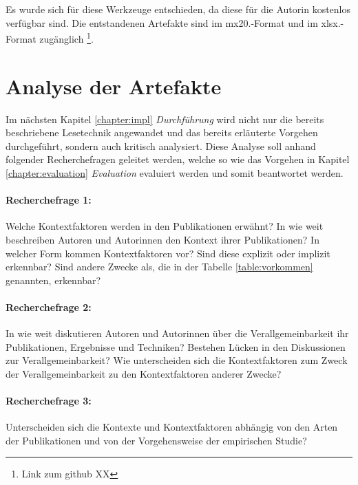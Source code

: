 Es wurde sich für diese Werkzeuge entschieden, da diese für die Autorin kostenlos verfügbar sind.
Die entstandenen Artefakte sind im mx20.-Format und im xlsx.-Format zugänglich \footnote{Link zum github XX}.





\section{Analyse der Artefakte}
\label{sec:analysis-step}
Im nächsten Kapitel \ref{chapter:impl} \textit{Durchführung} wird nicht nur die bereits beschriebene Lesetechnik angewandet und das bereits erläuterte Vorgehen durchgeführt, sondern auch kritisch analysiert. Diese Analyse soll anhand folgender Recherchefragen geleitet werden, welche so wie das Vorgehen in Kapitel \ref{chapter:evaluation} \textit{Evaluation} evaluiert werden und somit beantwortet werden. \\

\paragraph{Recherchefrage 1:} Welche Kontextfaktoren werden in den Publikationen erwähnt? In wie weit beschreiben Autoren und Autorinnen den Kontext ihrer Publikationen? In welcher Form kommen Kontextfaktoren vor? Sind diese explizit oder implizit erkennbar? Sind andere Zwecke als, die in der Tabelle \ref{table:vorkommen} genannten, erkennbar?

\paragraph{Recherchefrage 2:} In wie weit diskutieren Autoren und Autorinnen über die Verallgemeinbarkeit ihr Publikationen, Ergebnisse und Techniken? Bestehen Lücken in den Diskussionen zur Verallgemeinbarkeit? Wie unterscheiden sich die Kontextfaktoren zum Zweck der Verallgemeinbarkeit zu den Kontextfaktoren anderer Zwecke?

\paragraph{Recherchefrage 3:} Unterscheiden sich die Kontexte und Kontextfaktoren abhängig von den Arten der Publikationen und von der Vorgehensweise der empirischen Studie?

